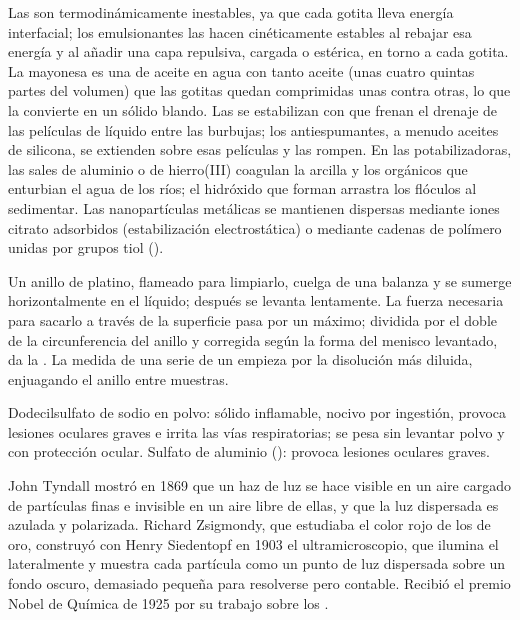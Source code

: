Las  son termodinámicamente inestables, ya que cada gotita lleva
energía interfacial; los emulsionantes las hacen cinéticamente estables al rebajar esa
energía y al añadir una capa repulsiva, cargada o estérica, en torno a cada gotita.
La mayonesa es una  de aceite en agua con tanto aceite (unas cuatro quintas partes del
volumen) que las gotitas quedan comprimidas unas contra otras, lo que la convierte en
un sólido blando. Las  se estabilizan con  que frenan el drenaje de las
películas de líquido entre las burbujas; los antiespumantes, a menudo aceites de silicona, se extienden sobre esas
películas y las rompen. En las potabilizadoras, las sales de aluminio o de hierro(III)
coagulan la arcilla y los  orgánicos que enturbian el agua de los ríos; el
hidróxido que forman arrastra los flóculos al sedimentar. Las nanopartículas metálicas
se mantienen dispersas mediante iones citrato adsorbidos (estabilización electrostática) o mediante cadenas de polímero
unidas por grupos tiol ().

\begin{inthelab}
Un anillo de platino, flameado para limpiarlo, cuelga de una balanza y se sumerge
horizontalmente en el líquido; después se levanta lentamente. La fuerza necesaria para sacarlo
a través de la superficie pasa por un máximo; dividida por el doble de la circunferencia del
anillo y corregida según la forma del menisco levantado, da la
. La medida de una serie de un  empieza por la disolución más
diluida, enjuagando el anillo entre muestras.
\end{inthelab}

\begin{safety}{}
Dodecilsulfato de sodio en polvo: sólido inflamable, nocivo por ingestión, provoca
lesiones oculares graves e irrita las vías respiratorias; se pesa sin levantar
polvo y con protección ocular. Sulfato de aluminio (): provoca lesiones oculares
graves.
\end{safety}

\begin{history}
John Tyndall mostró en 1869 que un haz de luz se hace visible en un aire cargado
de partículas finas e invisible en un aire libre de ellas, y que la luz dispersada
es azulada y polarizada. Richard Zsigmondy, que estudiaba el color rojo de los
 de oro, construyó con Henry Siedentopf en 1903 el ultramicroscopio, que ilumina
el  lateralmente y muestra cada partícula como un punto de luz dispersada
sobre un fondo oscuro, demasiado pequeña para resolverse pero contable. Recibió el
premio Nobel de Química de 1925 por su trabajo sobre los .
\end{history}

